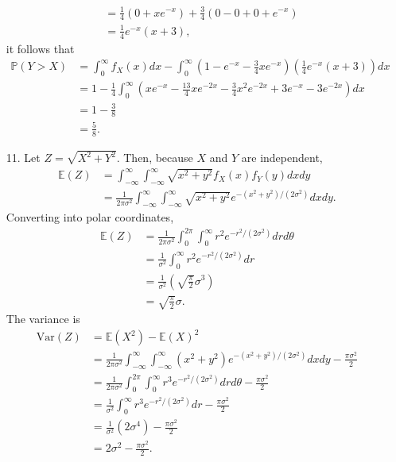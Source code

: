 \documentclass[a4paper,12pt]{article}
\begin{document}
\begin{enumerate}
\begin{align*}
            &= \frac{1}{4} \left( 0 + xe^{-x} \right) + \frac{3}{4} \left( 0 - 0 + 0 + e^{-x} \right) \\
            &= \frac{1}{4} e^{-x} (x + 3),
        \end{align*}
        it follows that
        \begin{align*}
            \mathbb{P}(Y > X) &= \int_0^\infty f_X(x) dx - \int_0^\infty \left( 1 - e^{-x} - \frac{3}{4}xe^{-x} \right) \left( \frac{1}{4} e^{-x} (x + 3) \right) dx \\
            &= 1 - \frac{1}{4} \int_0^\infty \left( xe^{-x} - \frac{13}{4}xe^{-2x} - \frac{3}{4}x^2e^{-2x} + 3e^{-x} - 3e^{-2x} \right) dx \\
            &= 1 - \frac{3}{8} \\
            &= \frac{5}{8}.
        \end{align*}

    \item[11.] 
        Let $Z = \sqrt{X^2 + Y^2}$. Then, because $X$ and $Y$ are independent,
        \begin{align*}
            \mathbb{E}(Z) &= \int_{-\infty}^\infty \int_{-\infty}^\infty \sqrt{x^2 + y^2} f_X(x) f_Y(y) dx dy \\
            &= \frac{1}{2 \pi \sigma^2} \int_{-\infty}^\infty \int_{-\infty}^\infty \sqrt{x^2 + y^2} e^{-(x^2 + y^2) / (2 \sigma^2)} dx dy.
        \end{align*}
        Converting into polar coordinates,
        \begin{align*}
            \mathbb{E}(Z) &= \frac{1}{2 \pi \sigma^2} \int_0^{2\pi} \int_0^\infty r^2 e^{-r^2 / (2 \sigma^2)} dr d\theta \\
            &= \frac{1}{\sigma^2} \int_0^\infty r^2 e^{-r^2 / (2 \sigma^2)} dr \\
            &= \frac{1}{\sigma^2} \left( \sqrt{\frac{\pi}{2}} \sigma^3 \right) \\
            &= \sqrt{\frac{\pi}{2}} \sigma. 
        \end{align*}
        The variance is
        \begin{align*}
            \text{Var}(Z) &= \mathbb{E}(X^2) - \mathbb{E}(X)^2 \\
            &= \frac{1}{2 \pi \sigma^2} \int_{-\infty}^\infty \int_{-\infty}^\infty (x^2 + y^2) e^{-(x^2 + y^2) / (2 \sigma^2)} dx dy - \frac{\pi \sigma^2}{2} \\
            &= \frac{1}{2 \pi \sigma^2} \int_{0}^{2\pi} \int_{0}^\infty r^3 e^{-r^2 / (2 \sigma^2)} dr d\theta - \frac{\pi \sigma^2}{2} \\
            &= \frac{1}{\sigma^2} \int_{0}^\infty r^3 e^{-r^2 / (2 \sigma^2)} dr - \frac{\pi \sigma^2}{2} \\
            &= \frac{1}{\sigma^2} \left( 2 \sigma^4 \right) - \frac{\pi \sigma^2}{2} \\
            &= 2 \sigma^2 - \frac{\pi \sigma^2}{2}.
        \end{align*}


\end{enumerate}
\end{document}
